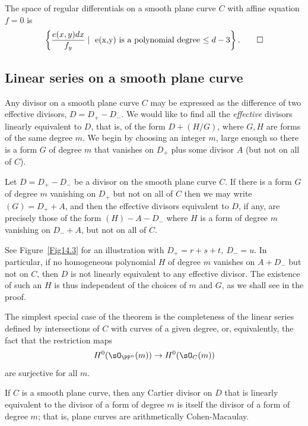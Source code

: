 \begin{theorem}
The space of regular differentials on a smooth plane curve $C$
with affine equation $f=0$ is 
$$
\left\{ \frac{e(x,y)dx}{f_{y}} \mid \hbox{ e(x,y) is a polynomial degree $\leq d-3$}\right\}.\qed
 $$
\end{theorem}

\subsection{Linear series on a smooth plane curve}\label{linear series on smooth plane curves}

Any divisor on a smooth plane curve $C$ may be expressed as the difference of
two effective divisors, $D= D_{+}-D_{-}$. We would like to find all the \emph{effective} divisors linearly equivalent to $D$, that is, of the form
$D + (H/G)$, where $G, H$ are forms of the same degree $m$. We begin by choosing
an integer $m$, large enough so there is a form $G$ of degree $m$ that vanishes on $D_{+}$ plus some divisor $A$ (but not on all of $C$). 

\begin{theorem}\label{equiv on smooth plane curve}
Let $D= D_{+}-D_{-}$ be a divisor on the smooth plane curve $C$. If
there is a form $G$ of degree $m$ vanishing on $D_{+}$ but not on all of $C$
then we may write $(G) = D_{+}+A$, and then
the effective divisors equivalent to $D$, if any, are precisely those 
of the form $(H) - A -D_{-}$ where $H$
is a form of degree $m$ vanishing on $D_{-}+A$, but not on all of $C$.
\end{theorem}

See Figure~\ref{Fig14.3} for an illustration with $D_+ = r+s+t, \ D_- = u$.
In particular, if no homogeneous polynomial $H$ of degree $m$ vanishes on  $A + D_{-}$ but not on $C$, then $D$ is not linearly equivalent to any effective divisor. The existence of such an $H$ is thus independent of the choices of $m$ and $G$, as we shall see in the proof.

The simplest special case of the theorem is the completeness of the linear series defined
by intersections of $C$ with curves of a given degree, 
or, equivalently, the fact that the restriction maps
$$
H^{0}(\sO_{\PP^{n}}(m)) \to H^{0}(\sO_{C}(m))
$$
are surjective for all $m$. 

\begin{proposition}\label {completeness of hyperplanes on plane curve}
If $C$ is a smooth plane curve, then any Cartier divisor on $D$ that is linearly equivalent to the divisor of
a form of degree $m$ is itself the divisor of a form of degree $m$; that is, plane curves are
arithmetically Cohen-Macaulay.
\end{proposition}

